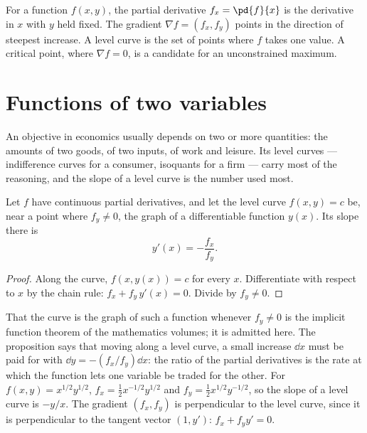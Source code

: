\begin{recall}
For a function $f(x, y)$, the partial derivative $f_x = \pd{f}{x}$ is the
derivative in $x$ with $y$ held fixed. The gradient $\nabla f = (f_x, f_y)$
points in the direction of steepest increase. A level curve is the set of
points where $f$ takes one value. A critical point, where $\nabla f = 0$, is
a candidate for an unconstrained maximum.
\end{recall}

\section{Functions of two variables}\label{sec:b1:constrained-optimisation:two-variables}

An objective in economics usually depends on two or more quantities: the
amounts of two goods, of two inputs, of work and leisure. Its level curves
--- indifference curves for a consumer, isoquants for a firm --- carry most
of the reasoning, and the slope of a level curve is the number used most.

\begin{proposition}\label{prop:b1:constrained-optimisation:level-slope}
Let $f$ have continuous partial derivatives, and let the level curve
$f(x, y) = c$ be, near a point where $f_y \neq 0$, the graph of a
differentiable function $y(x)$. Its slope there is
\[
y'(x) = -\frac{f_x}{f_y}.
\]
\end{proposition}

\begin{proof}
Along the curve, $f(x, y(x)) = c$ for every $x$. Differentiate with respect
to $x$ by the chain rule: $f_x + f_y\, y'(x) = 0$. Divide by $f_y \neq 0$.
\end{proof}

That the curve is the graph of such a function whenever $f_y \neq 0$ is the
implicit function theorem of the mathematics volumes; it is admitted here.
The proposition says that moving along a level curve, a small increase
$\dd x$ must be paid for with $\dd y = -(f_x/f_y)\dd x$: the ratio of the
partial derivatives is the rate at which the function lets one variable be
traded for the other. For $f(x, y) = x^{1/2}y^{1/2}$,
$f_x = \tfrac12 x^{-1/2}y^{1/2}$ and $f_y = \tfrac12 x^{1/2}y^{-1/2}$, so the
slope of a level curve is $-y/x$. The gradient $(f_x, f_y)$ is
perpendicular to the level curve, since it is perpendicular to the tangent
vector $(1, y')$: $f_x + f_y y' = 0$.

